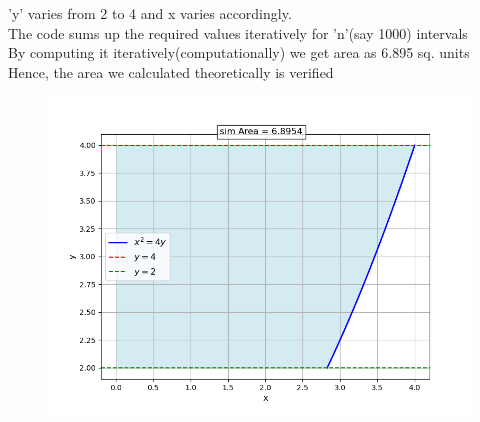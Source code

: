 \documentclass[journal]{IEEEtran}
\begin{document}
'y' varies from 2 to 4 and x varies accordingly.\\
The code sums up the required values iteratively for 'n'(say 1000) intervals\\
By computing it iteratively(computationally) we get area as 6.895 sq. units \\
Hence, the area we calculated theoretically is verified\\
\begin{figure}[ht!]
   \centering
   \includegraphics[width=\columnwidth]{figs/Figure_1.png}
\end{figure}
\end{document}

